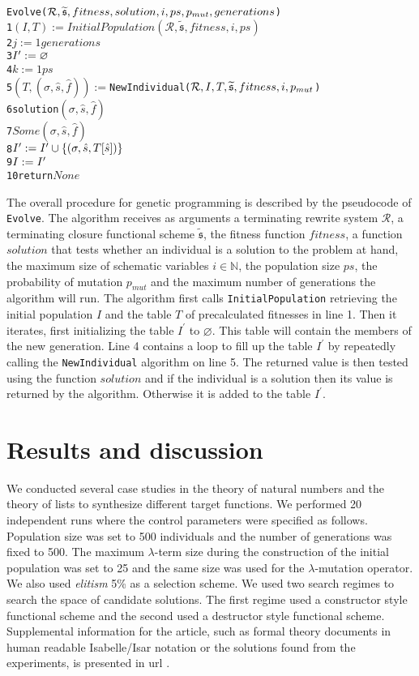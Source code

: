\begin{alltt}
   Evolve(\(\mathcal{R},\widetilde{\mathfrak{s}},fitness,solution,i,ps,p\sb{mut},generations\))
1  \((I,T):=InitialPopulation(\mathcal{R},\widetilde{\mathfrak{s}},fitness,i,ps)\)
2   \(j:=1\)  \(generations\) 
3    \(I\sp{\prime}:=\varnothing\)
4     \(k:=1\)  \(ps\) 
5      \((T,(\sigma,\hat{s},\hat{f})):=\)NewIndividual(\(\mathcal{R},I,T,\widetilde{\mathfrak{s}},fitness,i,p\sb{mut}\))
6       solution \((\sigma,\hat{s},\hat{f})\) 
7         \(Some (\sigma,\hat{s},\hat{f})\)
8      \(I\sp{\prime}:=I\sp{\prime}\cup\{(\sigma,\hat{s},T[\hat{s}])\}\)
9    \(I:=I\sp{\prime}\)
10 return \(None\)
\end{alltt}

The overall procedure for genetic programming is described by the pseudocode of \texttt{Evolve}. The algorithm receives as arguments a terminating rewrite system $\mathcal{R}$, a terminating closure functional scheme $\widetilde{\mathfrak{s}}$, the fitness function $fitness$, a function $solution$ that tests whether an individual is a solution to the problem at hand, the maximum size of schematic variables $i\in\mathbb{N}$, the population size $ps$, the probability of mutation $p_{mut}$ and the maximum number of generations the algorithm will run. The algorithm first calls \texttt{InitialPopulation} retrieving the initial population $I$ and the table $T$ of precalculated fitnesses in line 1. Then it iterates, first initializing the table $I^\prime$ to $\varnothing$. This table will contain the members of the new generation. Line 4 contains a loop to fill up the table $I^\prime$ by repeatedly calling the \texttt{NewIndividual} algorithm on line 5. The returned value is then tested using the function $solution$ and if the individual is a solution then its value is returned by the algorithm. Otherwise it is added to the table $I^\prime$.

\section{Results and discussion}
\label{sec:results}
We conducted several case studies in the theory of natural numbers and the theory of lists to synthesize different target functions. We performed 20 independent runs where the control parameters were specified as follows. Population size was set to 500 individuals and the number of generations was fixed to 500. The maximum $\lambda$-term size during the construction of the initial population was set to 25 and the same size was used for the $\lambda$-mutation operator. We also used {\em elitism} 5\% as a selection scheme. We used two search regimes to search the space of candidate solutions. The first regime used a constructor style functional scheme and the second used a destructor style functional scheme. \cbstart Supplemental information for the article, such as formal theory documents in human readable Isabelle/Isar notation or the solutions found from the experiments, is presented in url \cite{supplementary:gp}.
\cbend

